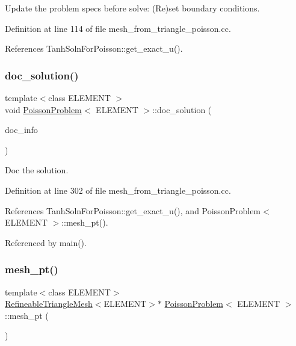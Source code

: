 Update the problem specs before solve\+: (Re)set boundary conditions. 



Definition at line 114 of file mesh\+\_\+from\+\_\+triangle\+\_\+poisson.\+cc.



References Tanh\+Soln\+For\+Poisson\+::get\+\_\+exact\+\_\+u().

\mbox{\label{classPoissonProblem_aab6f503fa242f687bb8452527bb7688f}} 
\subsubsection{\texorpdfstring{doc\+\_\+solution()}{doc\_solution()}}
{\footnotesize\ttfamily template$<$class E\+L\+E\+M\+E\+NT $>$ \\
void \hyperlink{classPoissonProblem}{Poisson\+Problem}$<$ E\+L\+E\+M\+E\+NT $>$\+::doc\+\_\+solution (\begin{DoxyParamCaption}\item[{Doc\+Info \&}]{doc\+\_\+info }\end{DoxyParamCaption})}



Doc the solution. 



Definition at line 302 of file mesh\+\_\+from\+\_\+triangle\+\_\+poisson.\+cc.



References Tanh\+Soln\+For\+Poisson\+::get\+\_\+exact\+\_\+u(), and Poisson\+Problem$<$ E\+L\+E\+M\+E\+N\+T $>$\+::mesh\+\_\+pt().



Referenced by main().

\mbox{\label{classPoissonProblem_aad9186546c682ff1aaae4fedc17e2c8c}} 
\subsubsection{\texorpdfstring{mesh\+\_\+pt()}{mesh\_pt()}\hspace{0.1cm}{\footnotesize\ttfamily [1/2]}}
{\footnotesize\ttfamily template$<$class E\+L\+E\+M\+E\+NT$>$ \\
\hyperlink{classoomph_1_1RefineableTriangleMesh}{Refineable\+Triangle\+Mesh}$<$E\+L\+E\+M\+E\+NT$>$$\ast$ \hyperlink{classPoissonProblem}{Poisson\+Problem}$<$ E\+L\+E\+M\+E\+NT $>$\+::mesh\+\_\+pt (\begin{DoxyParamCaption}{ }\end{DoxyParamCaption})\hspace{0.3cm}{\ttfamily [inline]}}



